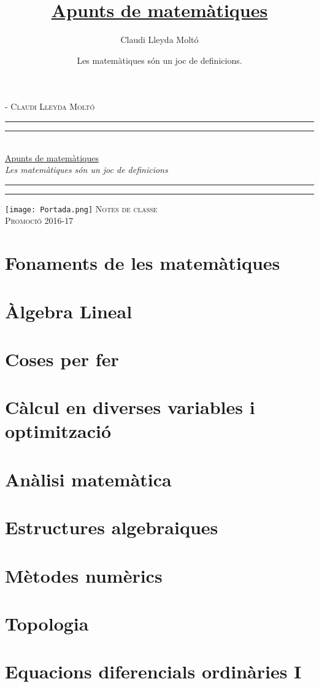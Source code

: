 \documentclass[10pt, a4paper, openany]{memoir}
\title{%
	\href{https://claudilleyda.github.io}{Apunts de matemàtiques}}
\author{Claudi Lleyda Moltó}
\date{Les matemàtiques són un joc de definicions.}
\theoremstyle{plain}
\theoremstyle{definition}
\newcommand*{\titleTMB}{\begingroup%
	\vspace*{0.1\textheight}
	\centering
	\settowidth{\unitlength}{\itshape Les matemàtiques són un joc de definicions}
	\vspace*{\baselineskip}
	{\large\scshape Claudi Lleyda Moltó}\\[\baselineskip]
	\rule{\unitlength}{1.6pt}\vspace*{-\baselineskip}\vspace*{2pt}
	\rule{\unitlength}{0.4pt}\\[\baselineskip]
	{\LARGE \href{https://claudilleyda.github.io}{Apunts de matemàtiques}}\\[\baselineskip] %
	{\itshape Les matemàtiques són un joc de definicions}\\[0.2\baselineskip]
	\rule{\unitlength}{0.4pt}\vspace*{-\baselineskip}\vspace{3.2pt}
	\rule{\unitlength}{1.6pt}%
	\vfill
	{\centering\texttt{[image: Portada.png]}}
	\vfill
	{\large\scshape Notes de classe}\\[\baselineskip]
	{\small\scshape Promoció 2016-17}\par
	\vspace*{0.1\textheight}
	\endgroup}
\let\originalpart=\part
\def\part{\cleardoublepage\originalpart}
\begin{document}
	{\hypersetup{urlcolor=black,linkcolor=black}
	\begin{titlingpage*}
		\calccentering{\unitlength}
		\begin{adjustwidth*}{\unitlength}{-\unitlength}
			\titleTMB
		\end{adjustwidth*}
	\end{titlingpage*}
	\tableofcontents}
	\part{Fonaments de les matemàtiques}
		
	\part{Àlgebra Lineal}
		
	\part{Coses per fer}
		
	\part{Càlcul en diverses variables i optimització}
		
	\part{Anàlisi matemàtica}
		
	\part{Estructures algebraiques}
		
	\part{Mètodes numèrics}
		
	\part{Topologia}
		
	\part{Equacions diferencials ordinàries I}
		
\end{document}

